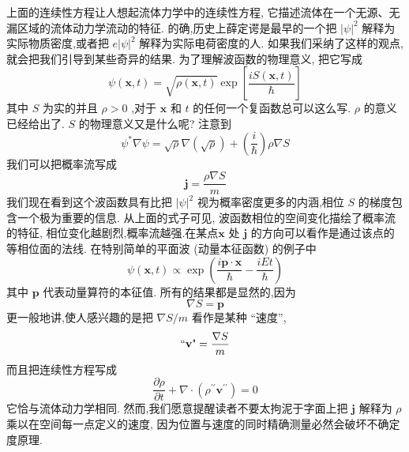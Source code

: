 \documentclass[lang=cn,newtx,10pt,scheme=chinese,thmcnt=section]{elegantbook}
\begin{document}
上面的连续性方程让人想起流体力学中的连续性方程, 它描述流体在一个无源、无漏区域的流体动力学流动的特征. 的确,历史上薛定谔是最早的一个把 ${\left| \psi \right| }^{2}$ 解释为实际物质密度,或者把 $e{\left| \psi \right| }^{2}$ 解释为实际电荷密度的人. 如果我们采纳了这样的观点,就会把我们引导到某些奇异的结果.
为了理解波函数的物理意义, 把它写成
\begin{equation}
	\psi \left( {\mathbf{x}, t}\right) = \sqrt{\rho \left( {\mathbf{x}, t}\right) }\exp \left\lbrack \frac{{iS}\left( {\mathbf{x}, t}\right) }{\hbar }\right\rbrack
\end{equation}
其中 $S$ 为实的并且 $\rho > 0$ ,对于 $\mathbf{x}$ 和 $t$ 的任何一个复函数总可以这么写. $\rho$ 的意义已经给出了. $S$ 的物理意义又是什么呢? 注意到
\begin{equation}
	{\psi }^{ * }\nabla \psi = \sqrt{\rho }\nabla \left( \sqrt{\rho }\right) + \left( \frac{i}{\hbar }\right) \rho \nabla S
\end{equation}
我们可以把概率流写成
\begin{equation}
	\mathbf{j} = \frac{\rho \nabla S}{m}
\end{equation}
我们现在看到这个波函数具有比把 ${\left| \psi \right| }^{2}$ 视为概率密度更多的内涵,相位 $S$ 的梯度包含一个极为重要的信息. 从上面的式子可见, 波函数相位的空间变化描绘了概率流的特征, 相位变化越剧烈,概率流越强.在某点$\mathbf{x}$ 处 $\mathbf{j}$ 的方向可以看作是通过该点的等相位面的法线. 在特别简单的平面波 (动量本征函数) 的例子中
\begin{equation}
	\psi \left( {\mathbf{x}, t}\right) \propto \exp \left( {\frac{i\mathbf{p} \cdot \mathbf{x}}{\hbar } - \frac{iEt}{\hbar }}\right) 
\end{equation}
其中 $\mathbf{p}$ 代表动量算符的本征值. 所有的结果都是显然的,因为
\begin{equation}
	\nabla S = \mathbf{p}
\end{equation}
更一般地讲,使人感兴趣的是把 $\nabla S/m$ 看作是某种 “速度”,
\begin{equation}
	\text{``\textbf{v}"}= \frac{\nabla S}{m}
\end{equation}
而且把连续性方程写成
\begin{equation}
	\frac{\partial \rho }{\partial t} + \nabla \cdot \left( {{\rho }^{\prime \prime }{\mathbf{v}}^{\prime \prime }}\right) = 0
\end{equation}
它恰与流体动力学相同. 然而,我们愿意提醒读者不要太拘泥于字面上把 $\mathbf{j}$ 解释为 $\rho$ 乘以在空间每一点定义的速度, 因为位置与速度的同时精确测量必然会破坏不确定度原理.
\end{document}

